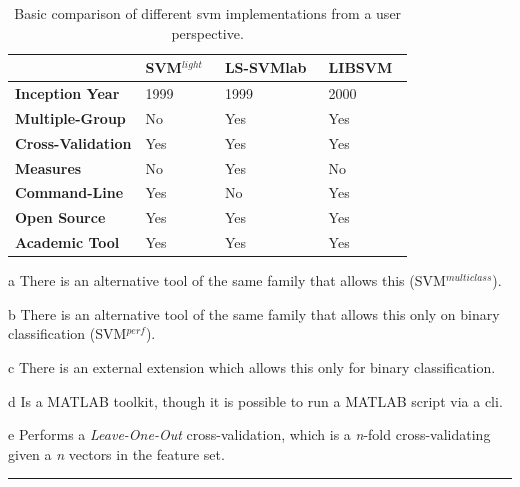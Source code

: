 \begin{table}[ht!]
    \centering
    \begin{threeparttable}
      \begin{tabular}{|l|l|l|l|}
        \rowcolor[RGB]{169,196,223}
        \hline & \textbf{SVM$^{light}$~\cite{Joa99}} & \textbf{LS-SVMlab~\cite{SV99, PSV+02}} & \textbf{LIBSVM~\cite{CL11}}  \\
        \hline \cellcolor[RGB]{169,196,223} \textbf{Inception Year} & 1999 & 1999 & 2000  \\
        \hline \cellcolor[RGB]{169,196,223} \textbf{Multiple-Group} & No\tnote{a} & Yes & Yes \\
        \hline \cellcolor[RGB]{169,196,223} \textbf{Cross-Validation} & Yes\tnote{e} & Yes & Yes \\
        \hline \cellcolor[RGB]{169,196,223} \textbf{Measures} & No\tnote{b} & Yes & No\tnote{c} \\
        \hline \cellcolor[RGB]{169,196,223} \textbf{Command-Line} & Yes & No\tnote{d} & Yes\tnote{f} \\
        \hline \cellcolor[RGB]{169,196,223} \textbf{Open Source} & Yes & Yes & Yes \\
        \hline \cellcolor[RGB]{169,196,223} \textbf{Academic Tool} & Yes & Yes & Yes \\
        \hline
      \end{tabular}
      \begin{tablenotes}
        \item[a] There is an alternative tool of the same family that allows this (SVM$^{multiclass}$).
        \item[b] There is an alternative tool of the same family that allows this only on binary classification (SVM$^{perf}$).
        \item[c] There is an external extension which allows this only for binary classification.
        \item[d] Is a MATLAB toolkit, though it is possible to run a MATLAB script via a \gls{cli}.
        \item[e] Performs a \emph{Leave-One-Out} cross-validation, which is a \emph{n}-fold cross-validating given a \emph{n} vectors in the feature set.
      \end{tablenotes}
    \end{threeparttable}
    \caption{Basic comparison of different \gls{svm} implementations from a user perspective.}
    \vspace{2mm}
    \hrule
    \label{tab:svm_tools}
  \end{table}

